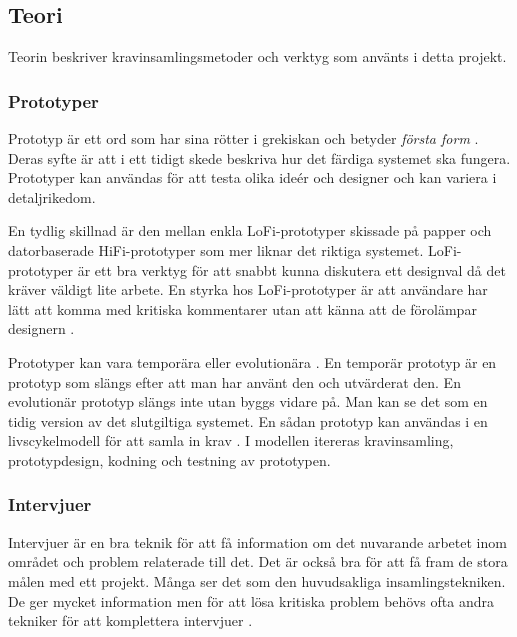 \subsection{Teori}
Teorin beskriver kravinsamlingsmetoder och  verktyg som använts i detta projekt. %

\subsubsection{Prototyper}
Prototyp är ett ord som har sina rötter i grekiskan och betyder \textit{första form} \cite{Arvola}. Deras syfte är att i ett tidigt skede beskriva hur det färdiga systemet ska fungera. Prototyper kan användas för att testa olika ideér och designer och kan variera i detaljrikedom. 

En tydlig skillnad är den mellan enkla LoFi-prototyper skissade på papper och datorbaserade HiFi-prototyper som mer liknar det riktiga systemet. LoFi-prototyper är ett bra verktyg för att snabbt kunna diskutera ett designval då det kräver väldigt lite arbete. En styrka hos LoFi-prototyper är att användare har lätt att komma med kritiska kommentarer utan att känna att de förolämpar designern \cite{Arvola}.

Prototyper kan vara temporära eller evolutionära \cite{Arvola}. En temporär prototyp är en prototyp som slängs efter att man har använt den och utvärderat den. En evolutionär prototyp slängs inte utan byggs vidare på. Man kan se det som en tidig version av det slutgiltiga systemet. En sådan prototyp kan användas i en livscykelmodell för att samla in krav \cite{Dorfman}. I modellen itereras kravinsamling, prototypdesign, kodning och testning av prototypen.

\subsubsection{Intervjuer}
Intervjuer är en bra teknik för att få information om det nuvarande arbetet inom området och problem relaterade till det. Det är också bra för att få fram de stora målen med ett projekt. Många ser det som den huvudsakliga insamlingstekniken. De ger mycket information men för att lösa kritiska problem behövs ofta andra tekniker för att komplettera intervjuer \cite{Lauesen}. 
